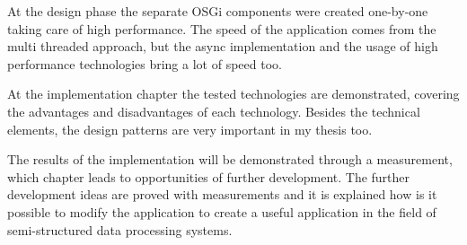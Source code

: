 At the design phase the separate OSGi components were created one-by-one taking care of high performance. The speed of the application comes from the multi threaded approach, but the async implementation and the usage of high performance technologies bring a lot of speed too.

At the implementation chapter the tested technologies are demonstrated, covering the advantages and disadvantages of each technology. Besides the technical elements, the design patterns are very important in my thesis too.

The results of the implementation will be demonstrated through a measurement, which chapter leads to opportunities of further development. The further development ideas are proved with measurements and it is explained how is it possible to modify the application to create a useful application in the field of semi-structured data processing systems.

\vfill